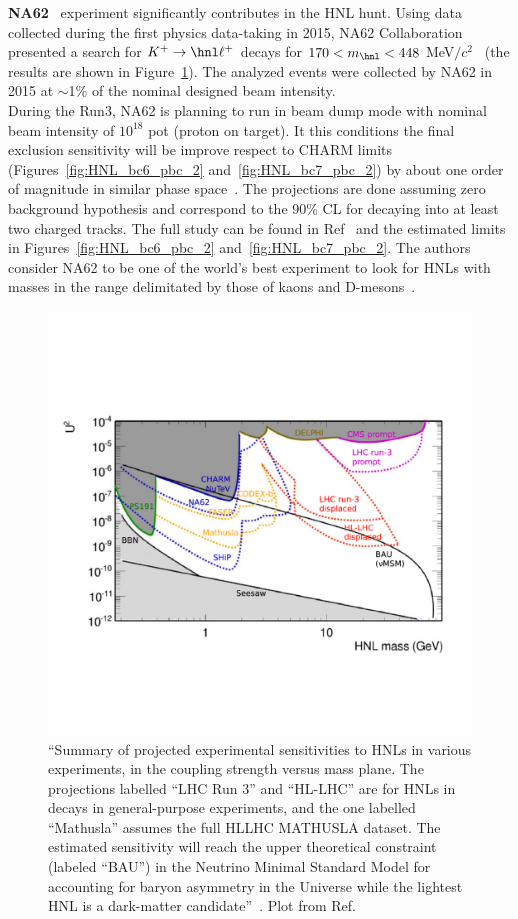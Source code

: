\textbf{NA62}~\cite{Gil_2017} experiment significantly contributes in
the HNL hunt. Using data 
collected during the first physics data-taking in 2015, NA62
Collaboration presented a search for $K^{+} \rightarrow \hnl \ell^{+}$
decays for $170 <m_\hnl< 448$ MeV$/c^{2}$~\cite{Cortina_Gil_2018} (the
results are shown in Figure~\ref{fig:HL_alimena}). The analyzed events
were collected by NA62 in 2015 at $\sim$1\% of the nominal designed
beam intensity.\\
During the Run3, NA62 is planning to run in beam dump mode with
nominal beam intensity of $10^{18}$ pot (proton on target). It this
conditions the final exclusion sensitivity will be improve
respect to CHARM limits (Figures~\ref{fig:HNL_bc6_pbc_2}
and~\ref{fig:HNL_bc7_pbc_2})
by about one order of magnitude in similar phase
space~\cite{na62Drewes_2018}.
The projections are done assuming zero background hypothesis and 
correspond to the 90\% CL for \hnl decaying into at least two
 charged tracks. The full study can be found in
 Ref~\cite{na62Drewes_2018} and the estimated limits in Figures~\ref{fig:HNL_bc6_pbc_2}
and~\ref{fig:HNL_bc7_pbc_2}. The authors consider NA62 to be one of
the world’s best experiment to look for HNLs with masses in the range
delimitated by those of kaons and D-mesons~\cite{na62Drewes_2018}.\\
\begin{figure}[h]
\centering
    \includegraphics[clip,trim=0.5cm 3.5cm 1.cm 4.3cm, width=.78\textwidth]{Figures/c7/projection_alimena.pdf}
\caption{``Summary of projected experimental sensitivities to HNLs in various
experiments, in the coupling strength \mixpar versus mass
plane. The projections labelled ``LHC Run 3'' and ``HL-LHC'' are for HNLs in \PW decays
in general-purpose experiments, and the one labelled ``Mathusla'' assumes the full HLLHC
MATHUSLA dataset. The estimated sensitivity will reach the upper theoretical
constraint (labeled ``BAU'') in the Neutrino Minimal Standard Model
for accounting for baryon asymmetry in the Universe
while the lightest HNL is a dark-matter
candidate''~\cite{PhysRevD.87.093006}. Plot from Ref.~\cite{Alimena_2020}}
\label{fig:HL_alimena}
\end{figure}

